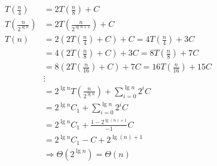 \documentclass[a4paper,12pt]{article}
\begin{document}
\begin{question}
\begin{subquestion}
\begin{answer}
\begin{align*}
  T\left(\frac{n}{4}\right) &= 2T\left(\frac{n}{8}\right) + C\\
  T\left(\frac{n}{2^{\lg n}}\right) &= 2T\left(\frac{n}{2^{\lg n+1}}\right) + C\\
  T(n) &= 2\left(2T\left(\frac{n}{4}\right) + C\right) + C = 4T\left(\frac{n}{4}\right) + 3C\\
  &= 4\left(2T\left(\frac{n}{8}\right)+C\right)+3C = 8T\left(\frac{n}{8}\right)+7C\\
  &= 8\left(2T\left(\frac{n}{16}\right)+C\right)+7C = 16T\left(\frac{n}{16}\right)+15C\\
  &\vdots\\
  &= 2^{\lg n}T\left(\frac{n}{2^{\lg n}}\right) + \sum_{i=0}^{\lg n} 2^{i}C\\
  &= 2^{\lg n}C_1 + \sum_{i=0}^{\lg n} 2^{i}C\\
  &= 2^{\lg n}C_1 + \frac{1-2^{\lg(n)+1}}{-1}C\\
  &= 2^{\lg n}C_1-C+2^{\lg(n)+1}\\
  &\Rightarrow \Theta\left(2^{\lg n}\right) = \Theta(n)
\end{align*}
\end{answer}
\end{subquestion}
\end{question}
\end{document}
